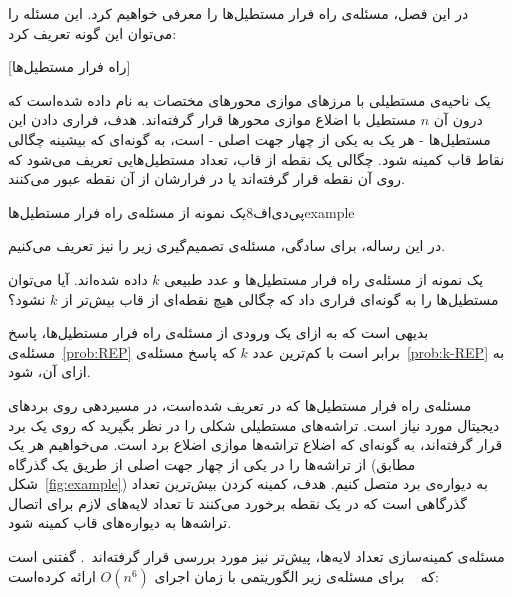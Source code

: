


در این فصل، مسئله‌ی راه فرار مستطیل‌ها را معرفی خواهیم کرد. این مسئله را می‌توان این گونه تعریف کرد:

[راه فرار مستطیل‌ها]
\label{prob:REP}

یک ناحیه‌ی مستطیلی با مرز‌های موازی محور‌های مختصات به نام  داده شده‌است که درون آن $n$ مستطیل با اضلاع موازی محور‌ها قرار گرفته‌اند. هدف، فراری دادن این مستطیل‌ها - هر یک به یکی از چهار جهت اصلی - است، به گونه‌ای که بیشینه چگالی نقاط قاب کمینه شود. چگالی یک نقطه از قاب، تعداد مستطیل‌هایی تعریف می‌شود که روی آن نقطه قرار گرفته‌اند یا در فرارشان از آن نقطه عبور می‌کنند.


‌پی‌دی‌اف{8}{یک نمونه از مسئله‌ی راه فرار مستطیل‌ها}{example}

در این رساله، برای سادگی، مسئله‌ی تصمیم‌گیری زیر را نیز تعریف می‌کنیم.

\label{prob:k-REP}

یک نمونه از مسئله‌ی راه فرار مستطیل‌ها و عدد طبیعی $k$ داده شده‌اند. آیا می‌توان مستطیل‌ها را به گونه‌ای فراری داد که چگالی هیچ نقطه‌ای از قاب بیش‌تر از $k$ نشود؟


بدیهی است که به ازای یک ورودی از مسئله‌ی راه فرار مستطیل‌ها، پاسخ مسئله‌ی~\ref{prob:REP} برابر است با کم‌ترین عدد $k$ که پاسخ مسئله‌ی~\ref{prob:k-REP} به ازای آن،  شود.

مسئله‌ی راه فرار مستطیل‌ها که در \cite{REP} تعریف شده‌است، در مسیر‌دهی روی برد‌های دیجیتال مورد نیاز است. تراشه‌های مستطیلی شکلی را در نظر بگیرید که روی یک برد قرار گرفته‌اند، به گونه‌ای که اضلاع تراشه‌ها موازی اضلاع برد است. می‌خواهیم هر یک از تراشه‌ها را در یکی از چهار جهت اصلی از طریق یک گذر‌گاه (مطابق شکل~\ref{fig:example}) به دیواره‌ی برد متصل کنیم. هدف، کمینه کردن بیش‌ترین تعداد گذرگاهی است که در یک نقطه برخورد می‌کنند تا تعداد لایه‌های لازم برای اتصال تراشه‌ها به دیواره‌های قاب کمینه شود.

مسئله‌ی کمینه‌سازی تعداد لایه‌ها، پیش‌تر نیز مورد بررسی قرار گرفته‌اند~\cite{BoundaryRec,KongBUSPLANNER,MaREP,MaOPT,motiveOZDAL,WuILP,Yan12,Yan2012,KongBIPARTITE}. گفتنی است که ~\cite{BoundaryRec} برای مسئله‌ی زیر الگوریتمی با زمان اجرای $O(n ^ 6)$ ارائه کرده‌است:

\label{prob:max-disjoint-rec}

